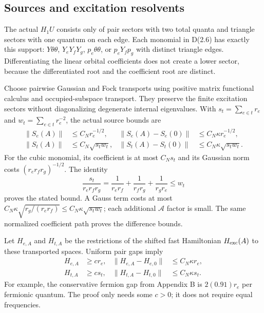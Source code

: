 \documentclass[11pt,letterpaper]{article}
\newcommand{\calA}{\mathcal A}
\begin{document}
\subsection{Sources and excitation resolvents}
The actual $H_1U$ consists only of pair sectors with two total quanta and triangle sectors with one quantum on each edge. Each monomial in D(2.6) has exactly this support: $Y\theta\theta$, $Y_eY_fY_g$, $p_e\theta\theta$, or $p_eY_fp_g$ with distinct triangle edges. Differentiating the linear orbital coefficients does not create a lower sector, because the differentiated root and the coefficient root are distinct.

Choose pairwise Gaussian and Fock transports using positive matrix functional calculus and occupied-subspace transport. They preserve the finite excitation sectors without diagonalizing degenerate internal eigenvalues. With $s_t=\sum_{e\in t}r_e$ and $w_t=\sum_{e\in t}r_e^{-2}$, the actual source bounds are
\begin{align}
 \|S_e(A)\|&\le C_Nr_e^{-1/2},&
 \|S_e(A)-S_e(0)\|&\le C_N\kappa r_e^{-1/2},\\
 \|S_t(A)\|&\le C_N\sqrt{s_tw_t},&
 \|S_t(A)-S_t(0)\|&\le C_N\kappa\sqrt{s_tw_t}. \label{eq:sourcepert}
\end{align}
For the cubic monomial, its coefficient is at most $C_Ns_t$ and its Gaussian norm costs $(r_er_fr_g)^{-1/2}$. The identity
\[
 \frac{s_t}{r_er_fr_g}
 =\frac1{r_er_f}+\frac1{r_fr_g}+\frac1{r_gr_e}\le w_t
\]
proves the stated bound. A Gauss term costs at most
$C_N\kappa\sqrt{r_g/(r_er_f)}\le C_N\kappa\sqrt{s_tw_t}$; each additional $\calA$ factor is small. The same normalized coefficient path proves the difference bounds.

Let $H_{e,A}$ and $H_{t,A}$ be the restrictions of the shifted fast Hamiltonian $H_{\rm exc}(A)$ to these transported spaces. Uniform pair gaps imply
\begin{align}
 H_{e,A}&\ge c r_e,&\|H_{e,A}-H_{e,0}\|&\le C_N\kappa r_e,\\
 H_{t,A}&\ge c s_t,&\|H_{t,A}-H_{t,0}\|&\le C_N\kappa s_t.
\end{align}
For example, the conservative fermion gap from Appendix B is $2(0.91)r_e$ per fermionic quantum. The proof only needs some $c>0$; it does not require equal frequencies.
\end{document}
